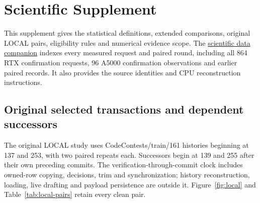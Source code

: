 \section{Scientific Supplement}
\label{sec:supplement}

This supplement gives the statistical definitions, extended comparisons, original LOCAL pairs, eligibility rules and numerical evidence scope. The \href{https://github.com/leecdiang/HeteroSpec/blob/a634e552366dec9b95ad1003dabdf1028a8ee63d/papers/taco/20261118_atelier_integration/artifact/SCIENTIFIC_DATA_INDEX.md}{scientific data companion} indexes every measured request and paired round, including all 864 RTX confirmation requests, 96 A5000 confirmation observations and earlier paired records. It also provides the source identities and CPU reconstruction instructions.

\FloatBarrier
\subsection{Original selected transactions and dependent successors}
\label{supp:local}
The original LOCAL study uses CodeContests/train/161 histories beginning at 137 and 253, with two paired repeats each. Successors begin at 139 and 255 after their own preceding commits. The verification-through-commit clock includes owned-row copying, decisions, trim and synchronization; history reconstruction, loading, live drafting and payload persistence are outside it. Figure~\ref{fig:local} and Table~\ref{tab:local-pairs} retain every clean pair.


